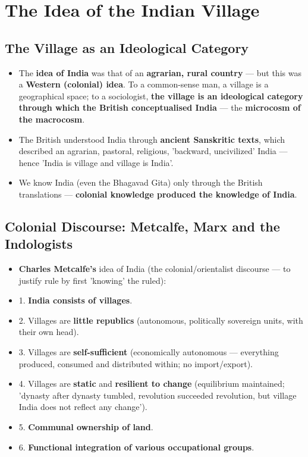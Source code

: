\chapter{The Idea of the Indian Village}

\section{The Village as an Ideological Category}

\begin{KeyConcept}
\begin{itemize}
\item The \textbf{idea of India} was that of an \textbf{agrarian, rural country} --- but this was a \textbf{Western (colonial) idea}. To a common-sense man, a village is a geographical space; to a sociologist, \textbf{the village is an ideological category through which the British conceptualised India} --- the \textbf{microcosm of the macrocosm}.
\item The British understood India through \textbf{ancient Sanskritic texts}, which described an agrarian, pastoral, religious, 'backward, uncivilized' India --- hence 'India is village and village is India'.
\item We know India (even the Bhagavad Gita) only through the British translations --- \textbf{colonial knowledge produced the knowledge of India}.
\end{itemize}
\end{KeyConcept}

\section{Colonial Discourse: Metcalfe, Marx and the Indologists}

\begin{KeyConcept}
\begin{itemize}
\item \textbf{Charles Metcalfe's} idea of India (the colonial/orientalist discourse --- to justify rule by first 'knowing' the ruled):
\item 1. \textbf{India consists of villages}.
\item 2. Villages are \textbf{little republics} (autonomous, politically sovereign units, with their own head).
\item 3. Villages are \textbf{self-sufficient} (economically autonomous --- everything produced, consumed and distributed within; no import/export).
\item 4. Villages are \textbf{static} and \textbf{resilient to change} (equilibrium maintained; 'dynasty after dynasty tumbled, revolution succeeded revolution, but village India does not reflect any change').
\item 5. \textbf{Communal ownership of land}.
\item 6. \textbf{Functional integration of various occupational groups}.
\end{itemize}
\end{KeyConcept}

